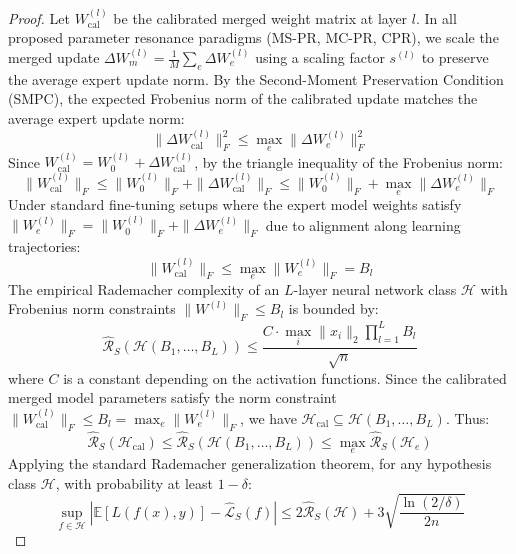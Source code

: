 \documentclass{article}
\theoremstyle{plain}
\theoremstyle{definition}
\theoremstyle{remark}
\begin{document}
\begin{proof}
Let $W^{(l)}_{\text{cal}}$ be the calibrated merged weight matrix at layer $l$. In all proposed parameter resonance paradigms (MS-PR, MC-PR, CPR), we scale the merged update $\Delta W_{m}^{(l)} = \frac{1}{M}\sum_e \Delta W_e^{(l)}$ using a scaling factor $s^{(l)}$ to preserve the average expert update norm. 
By the Second-Moment Preservation Condition (SMPC), the expected Frobenius norm of the calibrated update matches the average expert update norm:
\begin{equation}
    \|\Delta W_{\text{cal}}^{(l)}\|_F^2 \le \max_{e} \|\Delta W_e^{(l)}\|_F^2
\end{equation}
Since $W^{(l)}_{\text{cal}} = W_0^{(l)} + \Delta W_{\text{cal}}^{(l)}$, by the triangle inequality of the Frobenius norm:
\begin{equation}
    \|W^{(l)}_{\text{cal}}\|_F \le \|W_0^{(l)}\|_F + \|\Delta W_{\text{cal}}^{(l)}\|_F \le \|W_0^{(l)}\|_F + \max_e \|\Delta W_e^{(l)}\|_F
\end{equation}
Under standard fine-tuning setups where the expert model weights satisfy $\|W_e^{(l)}\|_F = \|W_0^{(l)}\|_F + \|\Delta W_e^{(l)}\|_F$ due to alignment along learning trajectories:
\begin{equation}
    \|W^{(l)}_{\text{cal}}\|_F \le \max_e \|W_e^{(l)}\|_F = B_l
\end{equation}
The empirical Rademacher complexity of an $L$-layer neural network class $\mathcal{H}$ with Frobenius norm constraints $\|W^{(l)}\|_F \le B_l$ is bounded by:
\begin{equation}
    \widehat{\mathcal{R}}_S(\mathcal{H}(B_1, \dots, B_L)) \le \frac{C \cdot \max_i \|x_i\|_2 \prod_{l=1}^L B_l}{\sqrt{n}}
\end{equation}
where $C$ is a constant depending on the activation functions. Since the calibrated merged model parameters satisfy the norm constraint $\|W^{(l)}_{\text{cal}}\|_F \le B_l = \max_e \|W_e^{(l)}\|_F$, we have $\mathcal{H}_{\text{cal}} \subseteq \mathcal{H}(B_1, \dots, B_L)$. Thus:
\begin{equation}
    \widehat{\mathcal{R}}_S(\mathcal{H}_{\text{cal}}) \le \widehat{\mathcal{R}}_S(\mathcal{H}(B_1, \dots, B_L)) \le \max_{e} \widehat{\mathcal{R}}_S(\mathcal{H}_e)
\end{equation}
Applying the standard Rademacher generalization theorem, for any hypothesis class $\mathcal{H}$, with probability at least $1-\delta$:
\begin{equation}
    \sup_{f \in \mathcal{H}} \left| \mathbb{E}[L(f(x), y)] - \widehat{\mathcal{L}}_S(f) \right| \le 2 \widehat{\mathcal{R}}_S(\mathcal{H}) + 3 \sqrt{\frac{\ln(2/\delta)}{2n}}

\end{equation}
\end{proof}
\end{document}
